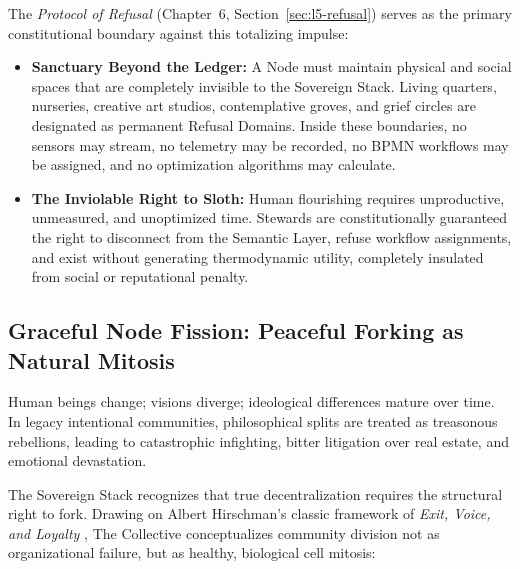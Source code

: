 The \textit{Protocol of Refusal} (Chapter~6, Section~\ref{sec:l5-refusal}) serves as the primary constitutional boundary against this totalizing impulse:
\begin{itemize}
    \item \textbf{Sanctuary Beyond the Ledger:} A Node must maintain physical and social spaces that are completely invisible to the Sovereign Stack. Living quarters, nurseries, creative art studios, contemplative groves, and grief circles are designated as permanent Refusal Domains. Inside these boundaries, no sensors may stream, no telemetry may be recorded, no BPMN workflows may be assigned, and no optimization algorithms may calculate.
    \item \textbf{The Inviolable Right to Sloth:} Human flourishing requires unproductive, unmeasured, and unoptimized time. Stewards are constitutionally guaranteed the right to disconnect from the Semantic Layer, refuse workflow assignments, and exist without generating thermodynamic utility, completely insulated from social or reputational penalty.
\end{itemize}

\subsection{Graceful Node Fission: Peaceful Forking as Natural Mitosis}

Human beings change; visions diverge; ideological differences mature over time. In legacy intentional communities, philosophical splits are treated as treasonous rebellions, leading to catastrophic infighting, bitter litigation over real estate, and emotional devastation.

The Sovereign Stack recognizes that true decentralization requires the structural right to fork. Drawing on Albert Hirschman's classic framework of \textit{Exit, Voice, and Loyalty} \parencite{hirschman1970}, The Collective conceptualizes community division not as organizational failure, but as healthy, biological cell mitosis:

